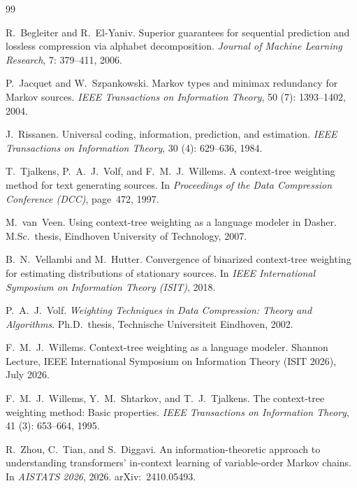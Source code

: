 \documentclass[11pt,a4paper]{article}
\begin{document}
\begin{thebibliography}{99}

R.~Begleiter and R.~El-Yaniv.
\newblock Superior guarantees for sequential prediction and lossless compression
  via alphabet decomposition.
\newblock \emph{Journal of Machine Learning Research}, 7: 379--411,
  2006.

P.~Jacquet and W.~Szpankowski.
\newblock Markov types and minimax redundancy for Markov sources.
\newblock \emph{IEEE Transactions on Information Theory}, 50
  (7): 1393--1402, 2004.

J.~Rissanen.
\newblock Universal coding, information, prediction, and estimation.
\newblock \emph{IEEE Transactions on Information Theory}, 30
  (4): 629--636, 1984.

T.~Tjalkens, P.~A.~J.~Volf, and F.~M.~J.~Willems.
\newblock A context-tree weighting method for text generating sources.
\newblock In \emph{Proceedings of the Data Compression Conference (DCC)},
  page~472, 1997.

M.~van~Veen.
\newblock Using context-tree weighting as a language modeler in Dasher.
\newblock M.Sc.\ thesis, Eindhoven University of Technology, 2007.

B.~N.~Vellambi and M.~Hutter.
\newblock Convergence of binarized context-tree weighting for estimating
  distributions of stationary sources.
\newblock In \emph{IEEE International Symposium on Information Theory (ISIT)},
  2018.

P.~A.~J.~Volf.
\newblock \emph{Weighting Techniques in Data Compression: Theory and
  Algorithms}.
\newblock Ph.D.\ thesis, Technische Universiteit Eindhoven, 2002.

F.~M.~J.~Willems.
\newblock Context-tree weighting as a language modeler.
\newblock Shannon Lecture, {IEEE International Symposium on Information Theory
  (ISIT 2026)}, July 2026.

F.~M.~J.~Willems, Y.~M.~Shtarkov, and T.~J.~Tjalkens.
\newblock The context-tree weighting method: Basic properties.
\newblock \emph{IEEE Transactions on Information Theory}, 41
  (3): 653--664, 1995.

R.~Zhou, C.~Tian, and S.~Diggavi.
\newblock An information-theoretic approach to understanding transformers'
  in-context learning of variable-order Markov chains.
\newblock In \emph{AISTATS 2026}, 2026.
\newblock arXiv:~2410.05493.

\end{thebibliography}
\end{document}

